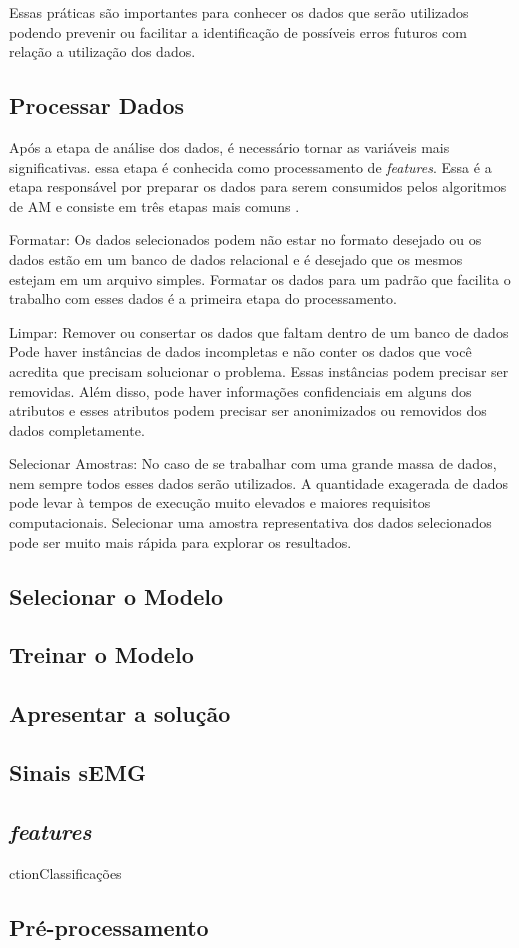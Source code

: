 Essas práticas são importantes para conhecer os dados que serão utilizados podendo prevenir ou facilitar a identificação de possíveis erros futuros com relação a utilização dos dados.

\subsection{Processar Dados}

Após a etapa de análise dos dados, é necessário tornar as variáveis mais significativas. essa etapa é conhecida como processamento de \textit{features}. Essa é a etapa responsável por preparar os dados para serem consumidos pelos algoritmos de AM e consiste em três etapas mais comuns \cite{prepareDataML}.

Formatar: Os dados selecionados podem não estar no formato desejado ou os dados estão em um banco de dados relacional e é desejado que os mesmos estejam em um arquivo simples. Formatar os dados para um padrão que facilita o trabalho com esses dados é a primeira etapa do processamento.

Limpar: Remover ou consertar os dados que faltam dentro de um banco de dados  Pode haver instâncias de dados incompletas e não conter os dados que você acredita que precisam solucionar o problema. Essas instâncias podem precisar ser removidas. Além disso, pode haver informações confidenciais em alguns dos atributos e esses atributos podem precisar ser anonimizados ou removidos dos dados completamente.

Selecionar Amostras: No caso de se trabalhar com uma grande massa de dados, nem sempre todos esses dados serão utilizados. A quantidade exagerada de dados pode levar à tempos de execução muito elevados e maiores requisitos computacionais. Selecionar uma amostra representativa dos dados selecionados pode ser muito mais rápida para explorar os resultados. 

\subsection{Selecionar o Modelo}

\subsection{Treinar o Modelo}

\subsection{Apresentar a solução}

\subsection{Sinais sEMG}
\subsection{\textit{features}
\subse}ction{Classificações}
\subsection{Pré-processamento}